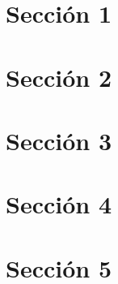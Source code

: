 \documentclass[11pt]{article}
\begin{document}
\def \universidad{FACULTAD}
\def \unidad{Trabajo Práctico N$^\circ$X}
\def \carrera{CARRERA O DEPARTAMENTO}
\def \materia{MATERIA}
\def \titulo{TITULO}
\def \logofac{preambulo/logoITBA.png} %


\newpage

\newpage
\pagestyle{empty}
\renewcommand{\contentsname}{{\textit{\huge Índice}}} %
\tableofcontents

\newpage
\pagestyle{empty}
\renewcommand{\listfigurename}{{\textit{\huge Lista de figuras}}}
\listoffigures

\newpage
\pagestyle{fancy} %
\setcounter{page}{1} %
\seteocontadores
\section{Sección 1}
\label{sec:seccion1}


\newpage
\seteocontadores
\section{Sección 2}
\label{sec:seccion2}


\newpage
\seteocontadores
\section{Sección 3}
\label{sec:seccion3}


\newpage
\seteocontadores
\section{Sección 4}
\label{sec:seccion4}


\newpage
\seteocontadores
\section{Sección 5}
\label{sec:seccion5}

\end{document}
